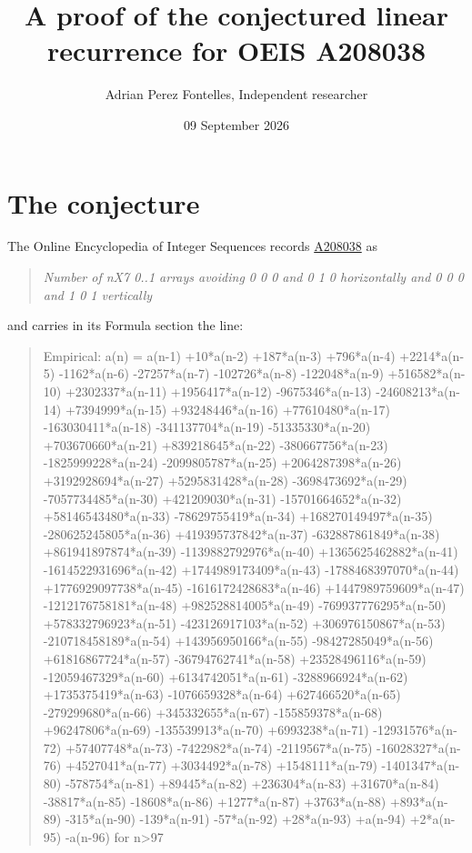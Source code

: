 \documentclass[11pt]{article}
\title{A proof of the conjectured linear recurrence for OEIS A208038}
\author{Adrian Perez Fontelles, Independent researcher}
\date{09 September 2026}
\theoremstyle{definition}
\begin{document}
\maketitle
\section{The conjecture}

The Online Encyclopedia of Integer Sequences records \href{https://oeis.org/A208038}{A208038} as

\begin{quote}\itshape Number of nX7 0..1 arrays avoiding 0 0 0 and 0 1 0 horizontally and 0 0 0 and 1 0 1 vertically\end{quote}

and carries in its Formula section the line:

\begin{quote}\ttfamily Empirical: a(n) = a(n-1) +10*a(n-2) +187*a(n-3) +796*a(n-4) +2214*a(n-5) -1162*a(n-6) -27257*a(n-7) -102726*a(n-8) -122048*a(n-9) +516582*a(n-10) +2302337*a(n-11) +1956417*a(n-12) -9675346*a(n-13) -24608213*a(n-14) +7394999*a(n-15) +93248446*a(n-16) +77610480*a(n-17) -163030411*a(n-18) -341137704*a(n-19) -51335330*a(n-20) +703670660*a(n-21) +839218645*a(n-22) -380667756*a(n-23) -1825999228*a(n-24) -2099805787*a(n-25) +2064287398*a(n-26) +3192928694*a(n-27) +5295831428*a(n-28) -3698473692*a(n-29) -7057734485*a(n-30) +421209030*a(n-31) -15701664652*a(n-32) +58146543480*a(n-33) -78629755419*a(n-34) +168270149497*a(n-35) -280625245805*a(n-36) +419395737842*a(n-37) -632887861849*a(n-38) +861941897874*a(n-39) -1139882792976*a(n-40) +1365625462882*a(n-41) -1614522931696*a(n-42) +1744989173409*a(n-43) -1788468397070*a(n-44) +1776929097738*a(n-45) -1616172428683*a(n-46) +1447989759609*a(n-47) -1212176758181*a(n-48) +982528814005*a(n-49) -769937776295*a(n-50) +578332796923*a(n-51) -423126917103*a(n-52) +306976150867*a(n-53) -210718458189*a(n-54) +143956950166*a(n-55) -98427285049*a(n-56) +61816867724*a(n-57) -36794762741*a(n-58) +23528496116*a(n-59) -12059467329*a(n-60) +6134742051*a(n-61) -3288966924*a(n-62) +1735375419*a(n-63) -1076659328*a(n-64) +627466520*a(n-65) -279299680*a(n-66) +345332655*a(n-67) -155859378*a(n-68) +96247806*a(n-69) -135539913*a(n-70) +6993238*a(n-71) -12931576*a(n-72) +57407748*a(n-73) -7422982*a(n-74) -2119567*a(n-75) -16028327*a(n-76) +4527041*a(n-77) +3034492*a(n-78) +1548111*a(n-79) -1401347*a(n-80) -578754*a(n-81) +89445*a(n-82) +236304*a(n-83) +31670*a(n-84) -38817*a(n-85) -18608*a(n-86) +1277*a(n-87) +3763*a(n-88) +893*a(n-89) -315*a(n-90) -139*a(n-91) -57*a(n-92) +28*a(n-93) +a(n-94) +2*a(n-95) -a(n-96) for n>97\end{quote}
\end{document}
